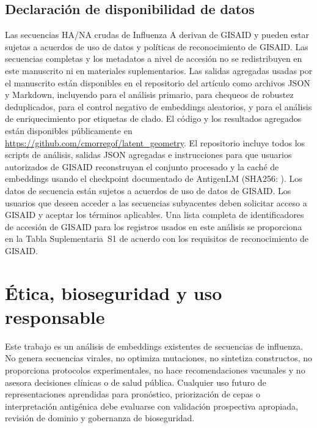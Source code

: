 \documentclass[11pt]{article}
\begin{document}
\subsection*{Declaración de disponibilidad de datos}

Las secuencias HA/NA crudas de Influenza A derivan de GISAID \cite{shu2017gisaid} y pueden estar sujetas a acuerdos de uso de datos y políticas de reconocimiento de GISAID. Las secuencias completas y los metadatos a nivel de accesión no se redistribuyen en este manuscrito ni en materiales suplementarios. Las salidas agregadas usadas por el manuscrito están disponibles en el repositorio del artículo como archivos JSON y Markdown, incluyendo  para el análisis primario,  para chequeos de robustez deduplicados,  para el control negativo de embeddings aleatorios, y  para el análisis de enriquecimiento por etiquetas de clado. El código y los resultados agregados están disponibles públicamente en \url{https://github.com/cmorregof/latent_geometry}. El repositorio incluye todos los scripts de análisis, salidas JSON agregadas e instrucciones para que usuarios autorizados de GISAID reconstruyan el conjunto procesado y la caché de embeddings usando el checkpoint documentado de AntigenLM (SHA256: ). Los datos de secuencia están sujetos a acuerdos de uso de datos de GISAID. Los usuarios que deseen acceder a las secuencias subyacentes deben solicitar acceso a GISAID y aceptar los términos aplicables. Una lista completa de identificadores de accesión de GISAID para los registros usados en este análisis se proporciona en la Tabla Suplementaria~S1 de acuerdo con los requisitos de reconocimiento de GISAID.

\section{Ética, bioseguridad y uso responsable}

Este trabajo es un análisis de embeddings existentes de secuencias de influenza. No genera secuencias virales, no optimiza mutaciones, no sintetiza constructos, no proporciona protocolos experimentales, no hace recomendaciones vacunales y no asesora decisiones clínicas o de salud pública. Cualquier uso futuro de representaciones aprendidas para pronóstico, priorización de cepas o interpretación antigénica debe evaluarse con validación prospectiva apropiada, revisión de dominio y gobernanza de bioseguridad.
\end{document}
